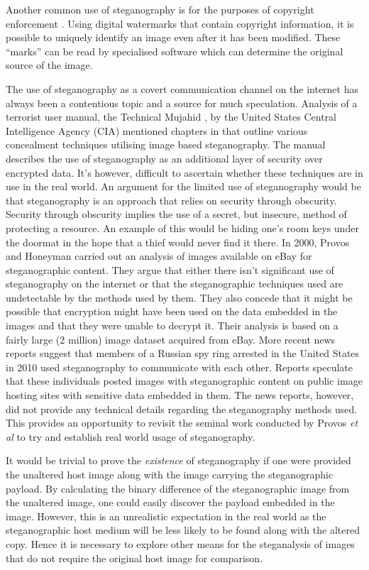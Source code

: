 \documentclass[12pt]{extreport}
\begin{document}
Another common use of steganography is for the purposes of copyright enforcement  \cite{kundur2002digital}. Using digital watermarks that contain copyright information,  it is possible to uniquely identify an image even after it has  been modified. These ``marks'' can be read by specialised software which can determine the original source of the image.
\par The use of steganography as a covert communication channel on the internet has always been a contentious topic and a source for much speculation. Analysis of a terrorist user manual, the Technical Mujahid \cite{alfajr}, by the United States Central Intelligence Agency (CIA) mentioned chapters in that outline various concealment techniques utilising image based steganography. The manual describes the use of steganography as an additional layer of security over encrypted data. It's however, difficult to ascertain whether these techniques are in use in the real world. An argument for the limited use of steganography would be that steganography is an approach that relies on security through obscurity. Security through obscurity implies the use of a secret, but insecure, method of protecting a resource. An example of this would be hiding one's room keys under the doormat in the hope that a thief would never find it there. In 2000, Provos and Honeyman \cite{provos2001detecting}  carried out an analysis of images available on eBay for steganographic content.  They argue that either there isn't  significant use of steganography on the internet or that the steganographic techniques used are undetectable by the methods used by them. They also concede that it might be possible that encryption might have been used on the data embedded in the images and that they were unable to decrypt it. Their analysis is based on a fairly large (2 million) image dataset acquired from eBay.   More recent news reports  \cite{spies2010} suggest that members of a Russian spy ring arrested in the United States in 2010 used steganography to communicate with each other. Reports speculate that these individuals posted images with steganographic content on public image hosting sites with sensitive data embedded in them. The news reports, however, did not provide any technical details regarding the steganography methods used. This provides an opportunity to revisit the seminal work conducted by Provos \emph{et al} to try and establish real world usage of steganography.

It would be trivial to prove the \emph{existence} of steganography if one were provided the unaltered host image along with the image carrying the steganographic payload. By calculating the binary difference of the steganographic image from the unaltered image, one could easily discover the payload embedded in the image. However, this is an unrealistic expectation in the real world as the steganographic host medium will be less likely to be found along with the altered copy. Hence it is necessary to explore other means for the steganalysis of images that do not require the original host image for comparison.
\end{document}
